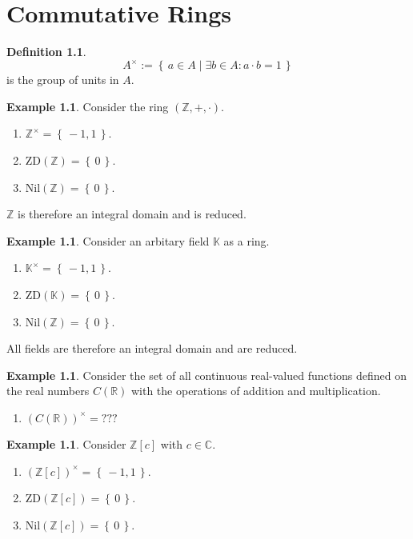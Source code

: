 \documentclass{book}
\theoremstyle{plain}
\theoremstyle{definition}
\newtheorem{exmp}[thm]{Example} %
\theoremstyle{custom_definition}
\newtheorem{defn}[thm]{Definition}
\newcommand{\set}[1]{\left\{\, #1 \,\right\}}
\newcommand{\makeset}[2]{\left\{\, #1 \mid #2 \,\right\}}
\begin{document}
%
%
%
\chapter{Commutative Rings}
\begin{defn}
    \begin{equation}
        A^\times := \makeset{a \in A}{\exists b \in A : a \cdot b = 1}
    \end{equation}
    is the group of units in \(A\).
\end{defn}


\begin{exmp}
    Consider the ring \((\mathbb{Z}, +, \cdot)\).
    \begin{enumerate}
        \item \( \mathbb{Z}^\times = \set{-1, 1} \).
        \item \( \text{ZD}(\mathbb{Z}) = \set{0} \).
        \item \( \text{Nil}(\mathbb{Z}) = \set{0} \).
    \end{enumerate}
    \(\mathbb{Z}\) is therefore an integral domain and is reduced.
\end{exmp}

\begin{exmp}
    Consider an arbitary field \(\mathbb{K}\) as a ring.
    \begin{enumerate}
        \item \( \mathbb{K}^\times = \set{-1, 1} \).
        \item \( \text{ZD}(\mathbb{K}) = \set{0}\).
        \item \( \text{Nil}(\mathbb{Z}) = \set{0} \).
    \end{enumerate}
    All fields are therefore an integral domain and are reduced.
\end{exmp}

\begin{exmp}
    Consider the set of all continuous real-valued functions defined on the real numbers \(C(\mathbb{R})\) with the operations of addition and multiplication.
    \begin{enumerate}
        \item \((C(\mathbb{R}))^\times = ???\) %
    \end{enumerate}
\end{exmp}

\begin{exmp}
    Consider \(\mathbb{Z}[c]\) with \(c \in \mathbb{C}\).
    \begin{enumerate}
        \item \( (\mathbb{Z}[c])^\times = \set{-1, 1}\).
        \item \( \text{ZD}(\mathbb{Z}[c]) = \set{ 0 } \).
        \item \( \text{Nil}(\mathbb{Z}[c]) = \set{0} \).
    \end{enumerate}
\end{exmp}
\end{document}
